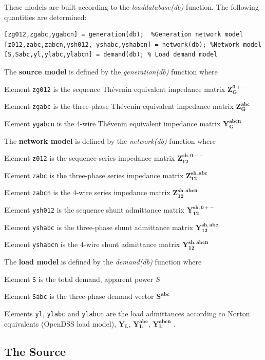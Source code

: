 \documentclass[12pt]{article}
\begin{document}
These models are built according to the {\em loaddatabase(db)} function. The following quantities are determined:

\begin{verbatim}
[zg012,zgabc,ygabcn] = generation(db);  %Generation network model
[z012,zabc,zabcn,ysh012, yshabc,yshabcn] = network(db); %Network model
[S,Sabc,yl,ylabc,ylabcn] = demand(db); % Load demand model
\end{verbatim}

The \textbf{source model} is defined by the {\em generation(db)} function where

Element \texttt{zg012} is the sequence Th\'evenin equivalent impedance matrix $\mathbf{Z^{0+-}_{G}}$

Element \texttt{zgabc} is the three-phase Th\'evenin equivalent impedance matrix $\mathbf{Z^{abc}_{G}}$

Element \texttt{ygabcn} is the 4-wire Th\'evenin equivalent impedance matrix $\mathbf{Y^{abcn}_{G}}$

The \textbf{network model} is defined by the {\em network(db)}  function where

Element \texttt{z012} is the sequence series impedance matrix $\mathbf{Z^{sh,0+-}_{12}}$

Element \texttt{zabc} is the three-phase series impedance matrix $\mathbf{Z^{sh,abc}_{12}}$

Element \texttt{zabcn} is the 4-wire series impedance matrix $\mathbf{Z^{sh,abcn}_{12}}$

Element \texttt{ysh012} is the sequence shunt admittance matrix $\mathbf{Y^{sh,0+-}_{12}}$

Element \texttt{yshabc} is the three-phase shunt admittance matrix $\mathbf{Y^{sh,abc}_{12}}$

Element \texttt{yshabcn} is the 4-wire shunt admittance matrix $\mathbf{Y^{sh,abcn}_{12}}$

The \textbf{load model} is   defined by the {\em demand(db)}  function where

Element \texttt{S} is the total demand, apparent power ${S}$

Element \texttt{Sabc} is the three-phase demand vector $\mathbf{S^{abc}}$

Elements \texttt{yl}, \texttt{ylabc} and \texttt{ylabcn} are the load admittances according to Norton equivalents (OpenDSS load model), $\mathbf{Y_{L}}$, $\mathbf{Y^{abc}_{L}}$, $\mathbf{Y^{abcn}_{L}}$ .


\subsection{The Source}
\end{document}
